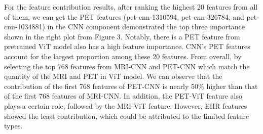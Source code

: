 \begin{table}[ht]
\caption{Modality testing results comparison using the hybrid ViT-CNN model in the same experiments settings with same subjects of two different datasets.}\label{tab:results-cls-modality}
\end{table}

For the feature contribution results, after ranking the highest 20 features from all of them, we can get the PET features (pet-cnn-1310594, pet-cnn-326784, and pet-cnn-1034881) in the CNN component demonstrated the top three importance shown in the right plot from Figure 3. Notably, there is a PET feature from pretrained ViT model also has a high feature importance. CNN’s PET features account for the largest proportion among these 20 features. From overall, by selecting the top 768 features from MRI-CNN and PET-CNN which match the quantity of the MRI and PET in ViT model. We can observe that the contribution of the first 768 features of PET-CNN is nearly 50\% higher than that of the first 768 features of MRI-CNN. In addition, the PET-ViT feature also plays a certain role, followed by the MRI-ViT feature. However, EHR features showed the least contribution, which could be attributed to the limited feature types. 

